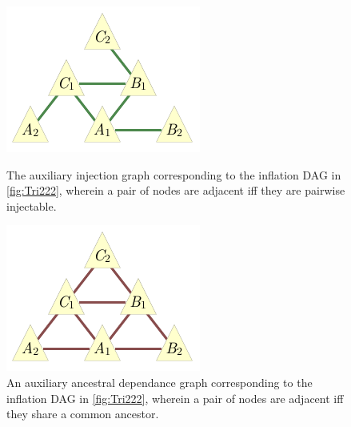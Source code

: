 \begin{figure}[t]
\centering
\begin{minipage}[b]{0.3\linewidth}
\centering
\includegraphics[scale=1]{injectiongraph222.pdf}
\caption{The auxiliary injection graph corresponding to the inflation DAG in \cref{fig:Tri222}, wherein a pair of nodes are adjacent iff they are pairwise injectable.}\label{fig:injection222}
\end{minipage}
\hfill
\begin{minipage}[b]{0.3\linewidth}
\centering
\includegraphics[scale=1]{ancestraldependancegraph222.pdf}
\caption{An auxiliary ancestral dependance graph corresponding to the inflation DAG in \cref{fig:Tri222}, wherein a pair of nodes are adjacent iff they share a common ancestor.}\label{fig:dependances222}
\end{minipage}
\hfill
\begin{minipage}[b]{0.3\linewidth}
\centering

\end{minipage}
\end{figure}
